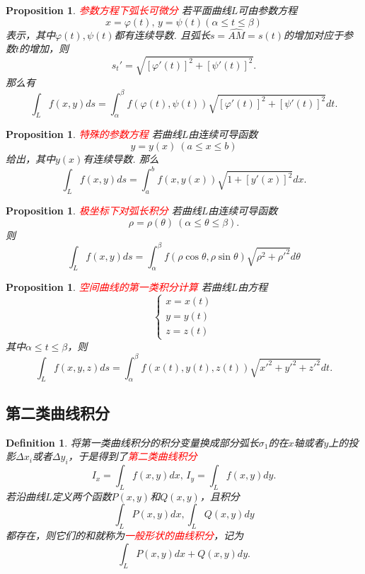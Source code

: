 \documentclass{article}
\newtheorem{proposition}[theorem]{Proposition}
\newtheorem{definition}[theorem]{Definition}
\newcommand{\redt}[1]{\textcolor{red}{#1}}
\begin{document}
\begin{proposition}
\rm \redt{参数方程下弧长可微分} 若平面曲线$L$可由参数方程
$$
x = \varphi(t), \, y = \psi(t) (\alpha \leq t \leq \beta)
$$
表示，其中$\varphi(t),\psi(t)$都有连续导数. 且弧长$s = \widehat{AM} = s(t)$的增加对应于参数$t$的增加，则
$$
s_t' = \sqrt{[\varphi'(t)]^2+[\psi'(t)]^2}.
$$
那么有
$$
\int_L f(x,y)ds = \int_\alpha^\beta f(\varphi(t),\psi(t))\sqrt{[\varphi'(t)]^2+[\psi'(t)]^2}dt. 
$$
\end{proposition}

\begin{proposition}
\rm \redt{特殊的参数方程} 若曲线$L$由连续可导函数
$$
y=y(x) ~ (a \leq x \leq b)
$$
给出，其中$y(x)$有连续导数. 那么
$$
\int_L f(x,y)ds = \int_a^b f(x,y(x))\sqrt{1+ [y'(x)]^2}dx. 
$$
\end{proposition}

\begin{proposition}
\rm \redt{极坐标下对弧长积分} 若曲线$L$由连续可导函数
$$
\rho = \rho(\theta) ~ (\alpha \leq \theta \leq \beta).
$$
则
$$
\int_L f(x,y)ds = \int_\alpha^\beta f(\rho\cos\theta,\rho\sin\theta)\sqrt{\rho^2+\rho'^2}d\theta
$$
\end{proposition}

\begin{proposition}
\rm \redt{空间曲线的第一类积分计算} 若曲线$L$由方程
$$
\left\{
\begin{array}{ll}
x = x(t)\\
y = y(t)\\
z = z(t) 
\end{array} \right.
$$
其中$\alpha \leq t \leq \beta$，则
$$
\int_L f(x,y,z)ds = \int_\alpha^{\beta} f(x(t),y(t),z(t))\sqrt{x'^2 + y'^2 + z'^2}dt.
$$
\end{proposition}

\subsection{第二类曲线积分}

\begin{definition}
\rm 将第一类曲线积分的积分变量换成部分弧长$\sigma_1$的在$x$轴或者$y$上的投影$\Delta x_i$或者$\Delta y_i$，于是得到了\redt{第二类曲线积分}
$$
I_x = \int_L f(x,y)dx,\, I_y = \int_L f(x,y)dy.
$$
若沿曲线$L$定义两个函数$P(x,y)$和$Q(x,y)$，且积分
$$
\int_L P(x,y)dx , \int_L Q(x,y)dy 
$$
都存在，则它们的和就称为\redt{一般形状的曲线积分}，记为
$$
\int_L P(x,y)dx + Q(x,y)dy.
$$
\end{definition}
\end{document}
